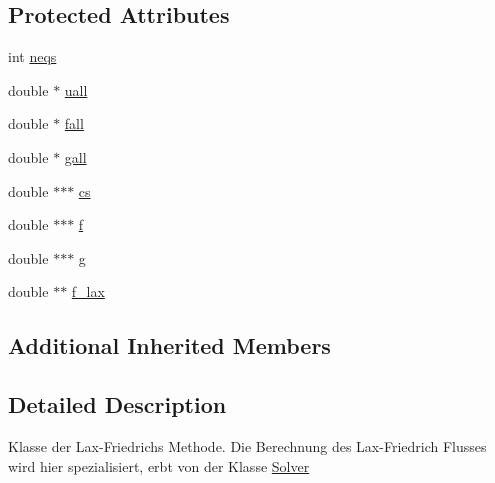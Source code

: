 \subsection*{Protected Attributes}
\begin{DoxyCompactItemize}
\item 
int \hyperlink{classLax__Friedrich_a54f821dda8e829ce85adc3afc77dce49}{neqs}
\item 
double $\ast$ \hyperlink{classLax__Friedrich_a46da19f1f8569252fde5ab59c357859c}{uall}
\item 
double $\ast$ \hyperlink{classLax__Friedrich_ad04ba32ac42deeae836e2acc594f7b52}{fall}
\item 
double $\ast$ \hyperlink{classLax__Friedrich_a46a918bceab80d7a6f2042a2e96cf4bd}{gall}
\item 
double $\ast$$\ast$$\ast$ \hyperlink{classLax__Friedrich_ae3409552d0a7e6e2168d7292183f2509}{cs}
\item 
double $\ast$$\ast$$\ast$ \hyperlink{classLax__Friedrich_a2e593b52e256ab0be6cf06eed59566e7}{f}
\item 
double $\ast$$\ast$$\ast$ \hyperlink{classLax__Friedrich_a78574df783b04827507ad183522ee021}{g}
\item 
double $\ast$$\ast$ \hyperlink{classLax__Friedrich_a007ddad79c40ef536d303cbe136dfdb6}{f\-\_\-lax}
\end{DoxyCompactItemize}
\subsection*{Additional Inherited Members}


\subsection{Detailed Description}
Klasse der Lax-\/\-Friedrichs Methode. Die Berechnung des Lax-\/\-Friedrich Flusses wird hier spezialisiert, erbt von der Klasse \hyperlink{classSolver}{Solver} 

